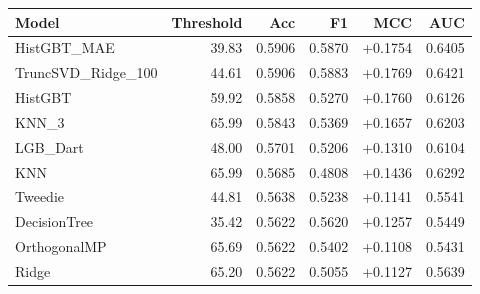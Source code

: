 \begin{tabular}{lrrrrr}
\toprule
Model & Threshold & Acc & F1 & MCC & AUC \\
\midrule
HistGBT\_MAE & 39.83 & 0.5906 & 0.5870 & +0.1754 & 0.6405 \\
TruncSVD\_Ridge\_100 & 44.61 & 0.5906 & 0.5883 & +0.1769 & 0.6421 \\
HistGBT & 59.92 & 0.5858 & 0.5270 & +0.1760 & 0.6126 \\
KNN\_3 & 65.99 & 0.5843 & 0.5369 & +0.1657 & 0.6203 \\
LGB\_Dart & 48.00 & 0.5701 & 0.5206 & +0.1310 & 0.6104 \\
KNN & 65.99 & 0.5685 & 0.4808 & +0.1436 & 0.6292 \\
Tweedie & 44.81 & 0.5638 & 0.5238 & +0.1141 & 0.5541 \\
DecisionTree & 35.42 & 0.5622 & 0.5620 & +0.1257 & 0.5449 \\
OrthogonalMP & 65.69 & 0.5622 & 0.5402 & +0.1108 & 0.5431 \\
Ridge & 65.20 & 0.5622 & 0.5055 & +0.1127 & 0.5639 \\
\bottomrule
\end{tabular}